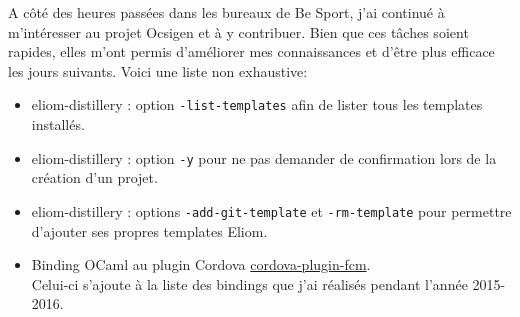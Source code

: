 A côté des heures passées dans les bureaux de Be Sport, j'ai continué à
m'intéresser au projet Ocsigen et à y contribuer. Bien que ces tâches soient
rapides, elles m'ont permis d'améliorer mes connaissances et d'être plus efficace
les jours suivants. Voici une liste non exhaustive:
\begin{itemize}
  \item eliom-distillery : option \verb|-list-templates| afin de lister tous les templates installés.
  \item eliom-distillery : option \verb|-y| pour ne pas demander de confirmation lors
    de la création d'un projet.
  \item eliom-distillery : options \verb|-add-git-template| et
\verb|-rm-template| pour permettre d'ajouter ses propres templates Eliom.\cite{eliom-distillery-repo}
  \item Binding OCaml au plugin Cordova
    \href{https://github.com/fechanique/cordova-plugin-fcm}{cordova-plugin-fcm}.\cite{ocaml-cordova-plugin-fcm} \\
    Celui-ci s'ajoute à la liste des bindings que j'ai réalisés pendant
l'année 2015-2016.\cite{ocaml-cordova-plugin-list}
\end{itemize}
